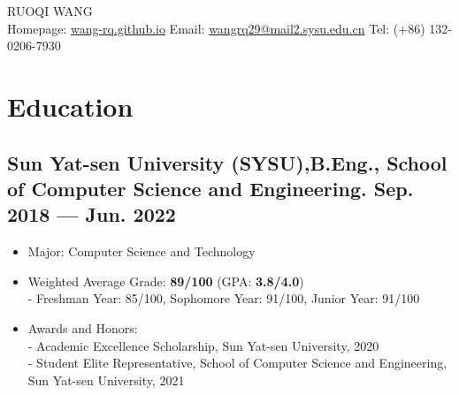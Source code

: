 \documentclass[a4,11pt]{article}
\newenvironment{zitemize}{
\begin{itemize}\itemsep0pt \parskip0pt \parsep1pt}
{\end{itemize}\vspace{-0.5cm}}
\begin{document}
\begin{center}

    \begin{minipage}[b]{0.9\textwidth}
            \centering
            {\Huge RUOQI WANG} \\ %
            \vspace{0.2cm}
			   Homepage: \href{https://wang-rq.github.io}{wang-rq.github.io} \space \space \space \space \space \space \space \space \space \space \space \space
Email: \href{mailto:wangrq29@mail2.sysu.edu.cn}{wangrq29@mail2.sysu.edu.cn} \space \space \space \space \space \space \space \space \space \space \space \space 
Tel: (+86) 132-0206-7930 
	\vspace{0.1cm}
    \end{minipage}%

    
\vspace{-0.15cm} 

\end{center}




\section{\large \textbf{Education}}

\subsection*{Sun Yat-sen University (SYSU),\space \space \space \space  B.Eng., \space \space \space \space    School of Computer Science and Engineering. \hfill Sep. 2018 --- Jun. 2022 } 
    \begin{zitemize}
        \item Major: Computer Science and Technology
		\item Weighted Average Grade: \textbf{89/100} (GPA: \textbf{3.8/4.0}) \\
		 - \space \space Freshman Year: 85/100, \space \space Sophomore Year: 91/100, \space \space Junior Year: 91/100
		\item Awards and Honors: \\
		 - \space \space Academic Excellence Scholarship, Sun Yat-sen University, 2020\\
		- \space \space Student Elite Representative, School of Computer Science and Engineering, Sun Yat-sen University, 2021\\
		

    \end{zitemize}
\vspace{0.2cm}
\end{document}
